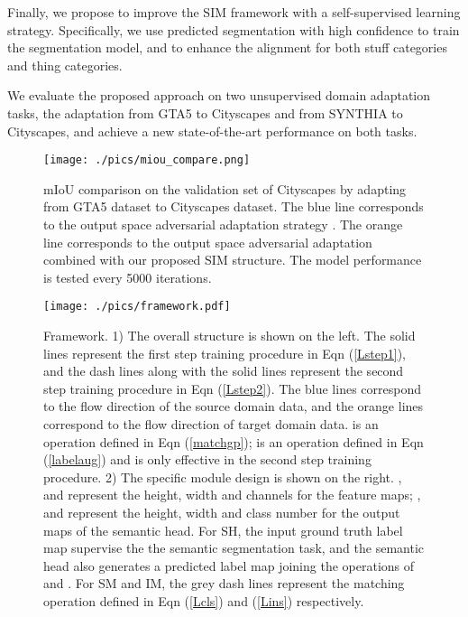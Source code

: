 \documentclass[10pt,twocolumn,letterpaper]{article}
\begin{document}
Finally, we propose to improve the SIM framework with a self-supervised learning strategy. Specifically, we use predicted segmentation with high confidence to train the segmentation model, and to enhance the alignment for both stuff categories and thing categories.

We evaluate the proposed approach on two unsupervised domain adaptation tasks, the adaptation from GTA5 to Cityscapes and from SYNTHIA to Cityscapes, and achieve a new state-of-the-art performance on both tasks.

\begin{figure}
\centering
\texttt{[image: ./pics/miou\_compare.png]}
\caption{mIoU comparison on the validation set of Cityscapes by adapting from GTA5 dataset to Cityscapes dataset. The blue line corresponds to the output space adversarial adaptation strategy \cite{outputspace}. The orange line corresponds to the output space adversarial adaptation combined with our proposed SIM structure. 
The model performance is tested every 5000 iterations.}
\label{miou_curve}
\vspace{-4mm}
\end{figure}
















\begin{figure*}
\centering

\texttt{[image: ./pics/framework.pdf]}
\caption{Framework. 1) The overall structure is shown on the left. The solid lines represent the first step training procedure in Eqn (\ref{Lstep1}), and the dash lines along with the solid lines represent the second step training procedure in Eqn (\ref{Lstep2}). The blue lines correspond to the flow direction of the source domain data, and the orange lines correspond to the flow direction of target domain data.  is an operation defined in Eqn (\ref{matchgp});  is an operation defined in Eqn (\ref{labelaug}) and is only effective in the second step training procedure. 2) The specific module design is shown on the right. ,  and  represent the height, width and channels for the feature maps; ,  and  represent the height, width and class number for the output maps of the semantic head. For SH, the input ground truth label map supervise the the semantic segmentation task, and the semantic head also generates a predicted label map joining the operations of  and . For SM and IM, the grey dash lines represent the matching operation defined in Eqn (\ref{Lcls}) and (\ref{Lins}) respectively.}
\label{frameworks}
\vspace{-3mm}
\end{figure*}
\end{document}
